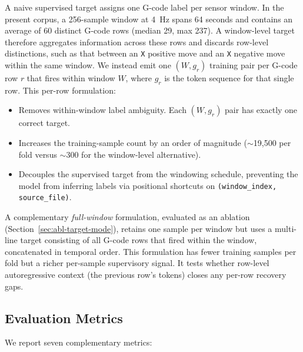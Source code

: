 \documentclass[sensors,article,submit,moreauthors,pdftex]{Definitions/mdpi}
\begin{document}
A naive supervised target assigns one G-code label per sensor window. In the present corpus, a 256-sample window at 4~Hz spans 64 seconds and contains an average of 60 distinct G-code rows (median 29, max 237). A window-level target therefore aggregates information across these rows and discards row-level distinctions, such as that between an \texttt{X} positive move and an \texttt{X} negative move within the same window. We instead emit one $(W, g_r)$ training pair per G-code row $r$ that fires within window $W$, where $g_r$ is the token sequence for that single row. This per-row formulation:

\begin{itemize}
\item Removes within-window label ambiguity. Each $(W, g_r)$ pair has exactly one correct target.
\item Increases the training-sample count by an order of magnitude ($\sim$19{,}500 per fold versus $\sim$300 for the window-level alternative).
\item Decouples the supervised target from the windowing schedule, preventing the model from inferring labels via positional shortcuts on \texttt{(window\_index, source\_file)}.
\end{itemize}

A complementary \emph{full-window} formulation, evaluated as an ablation (Section~\ref{sec:abl-target-mode}), retains one sample per window but uses a multi-line target consisting of all G-code rows that fired within the window, concatenated in temporal order. This formulation has fewer training samples per fold but a richer per-sample supervisory signal. It tests whether row-level autoregressive context (the previous row's tokens) closes any per-row recovery gaps.

\subsection{Evaluation Metrics}
\label{sec:metrics}

We report seven complementary metrics:
\end{document}
